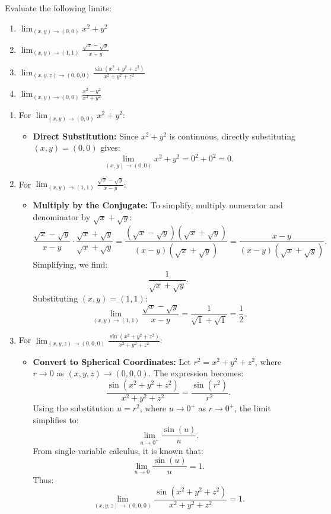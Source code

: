 \exampleline
\begin{example}
Evaluate the following limits:
\begin{enumerate}
    \item \( \lim_{(x, y) \to (0, 0)} x^2 + y^2 \)
    \item \( \lim_{(x, y) \to (1, 1)} \frac{\sqrt{x} - \sqrt{y}}{x - y} \)
    \item \( \lim_{(x, y, z) \to (0, 0, 0)} \frac{\sin(x^2 + y^2 + z^2)}{x^2 + y^2 + z^2} \)
    \item \( \lim_{(x, y) \to (0, 0)} \frac{x^2 - y^2}{x^2 + y^2} \)
\end{enumerate}

\begin{solution}
\begin{enumerate}
    \item For \( \lim_{(x, y) \to (0, 0)} x^2 + y^2 \):
    \begin{itemize}
        \item \textbf{Direct Substitution:} Since \( x^2 + y^2 \) is continuous, directly substituting \( (x, y) = (0, 0) \) gives:
        \[
        \lim_{(x, y) \to (0, 0)} x^2 + y^2 = 0^2 + 0^2 = 0.
        \]
    \end{itemize}

    \item For \( \lim_{(x, y) \to (1, 1)} \frac{\sqrt{x} - \sqrt{y}}{x - y} \):
    \begin{itemize}
        \item \textbf{Multiply by the Conjugate:} To simplify, multiply numerator and denominator by \( \sqrt{x} + \sqrt{y} \):
        \[
        \frac{\sqrt{x} - \sqrt{y}}{x - y} \cdot \frac{\sqrt{x} + \sqrt{y}}{\sqrt{x} + \sqrt{y}} = \frac{(\sqrt{x} - \sqrt{y})(\sqrt{x} + \sqrt{y})}{(x - y)(\sqrt{x} + \sqrt{y})} = \frac{x - y}{(x - y)(\sqrt{x} + \sqrt{y})}.
        \]
        Simplifying, we find:
        \[
        \frac{1}{\sqrt{x} + \sqrt{y}}.
        \]
        Substituting \( (x, y) = (1, 1) \):
        \[
        \lim_{(x, y) \to (1, 1)} \frac{\sqrt{x} - \sqrt{y}}{x - y} = \frac{1}{\sqrt{1} + \sqrt{1}} = \frac{1}{2}.
        \]
    \end{itemize}

    \item For \( \lim_{(x, y, z) \to (0, 0, 0)} \frac{\sin(x^2 + y^2 + z^2)}{x^2 + y^2 + z^2} \):
    \begin{itemize}
        \item \textbf{Convert to Spherical Coordinates:} Let \( r^2 = x^2 + y^2 + z^2 \), where \( r \to 0 \) as \( (x, y, z) \to (0, 0, 0) \). The expression becomes:
        \[
        \frac{\sin(x^2 + y^2 + z^2)}{x^2 + y^2 + z^2} = \frac{\sin(r^2)}{r^2}.
        \]
        Using the substitution \( u = r^2 \), where \( u \to 0^+ \) as \( r \to 0^+ \), the limit simplifies to:
        \[
        \lim_{u \to 0^+} \frac{\sin(u)}{u}.
        \]
        From single-variable calculus, it is known that:
        \[
        \lim_{u \to 0} \frac{\sin(u)}{u} = 1.
        \]
        Thus:
        \[
        \lim_{(x, y, z) \to (0, 0, 0)} \frac{\sin(x^2 + y^2 + z^2)}{x^2 + y^2 + z^2} = 1.
        \]
    \end{itemize}


\end{enumerate}
\end{solution}
\end{example}
